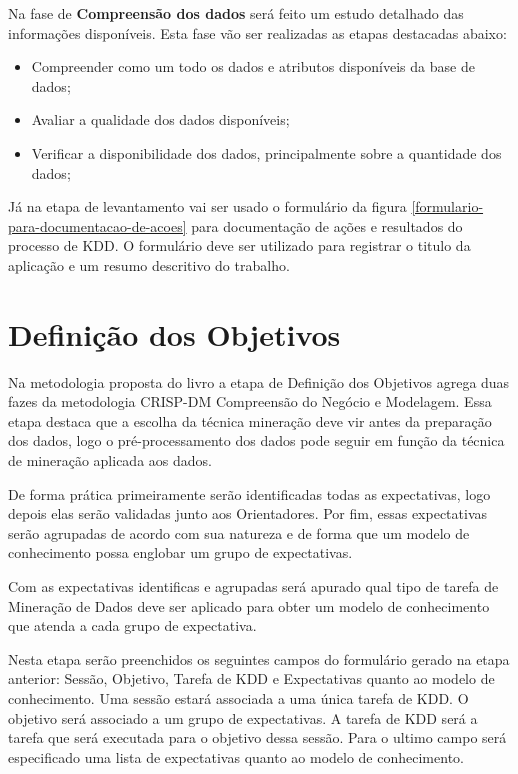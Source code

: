 \documentclass[diss,capa]{texufpel}
\begin{document}
Na fase de \textbf{Compreensão dos dados} será feito um estudo detalhado das informações disponíveis. Esta fase vão ser realizadas as etapas destacadas abaixo:
\begin{itemize}
\item Compreender como um todo os dados e atributos disponíveis da base de dados;
\item Avaliar a qualidade dos dados disponíveis;
\item Verificar a disponibilidade dos dados, principalmente sobre a quantidade dos dados;
\end{itemize}

Já na etapa de levantamento vai ser usado o formulário da figura \ref{formulario-para-documentacao-de-acoes} para documentação de ações e resultados do processo de KDD. O formulário deve ser utilizado para registrar o titulo da aplicação e um resumo descritivo do trabalho.



\section{Definição dos Objetivos}
\label{sec:definicao-dos-objetivos}

Na metodologia proposta do livro a etapa de Definição dos Objetivos agrega duas fazes da metodologia CRISP-DM Compreensão do Negócio e Modelagem. Essa etapa destaca que a escolha da técnica mineração deve vir antes da preparação dos dados, logo o pré-processamento dos dados pode seguir em função da técnica de mineração aplicada aos dados.

De forma prática primeiramente serão identificadas todas as expectativas, logo depois elas serão validadas junto aos Orientadores. Por fim, essas expectativas serão agrupadas de acordo com sua natureza e de forma que um modelo de conhecimento possa englobar um grupo de expectativas.

Com as expectativas identificas e agrupadas será apurado qual tipo de tarefa de Mineração de Dados deve ser aplicado para obter um modelo de conhecimento que atenda a cada grupo de expectativa.

Nesta etapa serão preenchidos os seguintes campos do formulário gerado na etapa anterior: Sessão, Objetivo, Tarefa de KDD e Expectativas quanto ao modelo de conhecimento.
Uma sessão estará associada a uma única tarefa de KDD. O objetivo será associado a um grupo de expectativas. A tarefa de KDD será a tarefa que será executada para o objetivo dessa sessão. Para o ultimo campo será especificado uma lista de expectativas quanto ao modelo de conhecimento.
\end{document}
